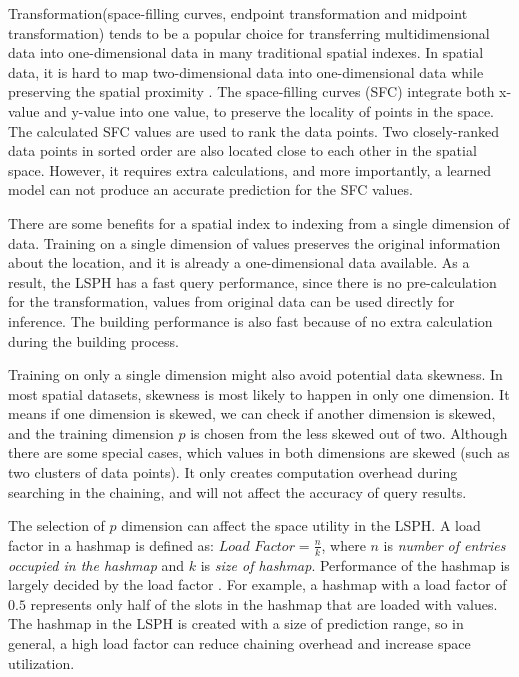 Transformation(space-filling curves, endpoint transformation and midpoint transformation) tends to be a popular choice for transferring multidimensional data into one-dimensional data in many traditional spatial indexes. In spatial data, it is hard to map two-dimensional data into one-dimensional data while preserving the spatial proximity \cite{Gaede:1998fp}. The space-filling curves (SFC) integrate both x-value and y-value into one value, to preserve the locality of points in the space. The calculated SFC values are used to rank the data points. Two closely-ranked data points in sorted order are also located close to each other in the spatial space. However, it requires extra calculations, and more importantly, a learned model can not produce an accurate prediction for the SFC values. 


There are some benefits for a spatial index to indexing from a single dimension of data. Training on a single dimension of values preserves the original information about the location, and it is already a one-dimensional data available. As a result, the LSPH has a fast query performance, since there is no pre-calculation for the transformation, values from original data can be used directly for inference. The building performance is also fast because of no extra calculation during the building process. 

Training on only a single dimension might also avoid potential data skewness. In most spatial datasets, skewness is most likely to happen in only one dimension. It means if one dimension is skewed, we can check if another dimension is skewed, and the training dimension $p$ is chosen from the less skewed out of two. Although there are some special cases, which values in both dimensions are skewed (such as two clusters of data points). It only creates computation overhead during searching in the chaining, and will not affect the accuracy of query results. 

 The selection of $p$ dimension can affect the space utility in the LSPH. A load factor in a hashmap is defined as: $\textit{Load Factor} = \frac{\textit{n}}{\textit{k}} $, where $n$ is \textit{number of entries occupied in the hashmap} and $k$ is \textit{size of hashmap}. Performance of the hashmap is largely decided by the load factor \cite{hashmap}. For example, a hashmap with a load factor of $0.5$ represents only half of the slots in the hashmap that are loaded with values. The hashmap in the LSPH is created with a size of prediction range, so in general, a high load factor can reduce chaining overhead and increase space utilization. 


